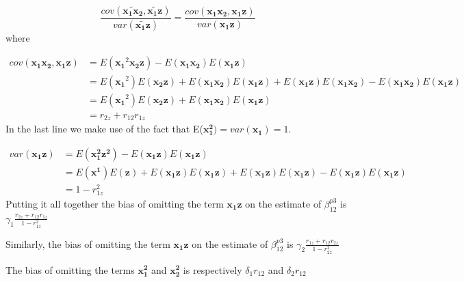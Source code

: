 \documentclass[12pt]{article}
\begin{document}
\begin{equation*}
\frac{cov(\widetilde{\mathbf{x_1 x_2}}, \widetilde{\mathbf{x_1 z}})}{var(\widetilde{\mathbf{x_1 z}})} =
\frac{cov(\mathbf{x_1 x_2}, \mathbf{x_1 z})}{var(\mathbf{x_1 z})} 
\end{equation*}
where 

\begin{align*}
cov(\mathbf{x_1 x_2}, \mathbf{x_1 z}) &= E(\mathbf{x_1}^2 \mathbf{x_2 z }) - E(\mathbf{x_1 x_2}) E(\mathbf{x_1 z}) \\
&= E(\mathbf{x_1}^2) E(\mathbf{x_2 z }) + E(\mathbf{x_1 x_2}) E(\mathbf{x_1 z}) + E(\mathbf{x_1 z}) E(\mathbf{x_1 x_2}) - E(\mathbf{x_1 x_2}) E(\mathbf{x_1 z}) \\
&= E(\mathbf{x_1}^2) E(\mathbf{x_2 z }) + E(\mathbf{x_1 x_2}) E(\mathbf{x_1 z}) \\
&= r_{2z} + r_{12} r_{1z}
\end{align*}
In the last line we make use of the fact that E($\mathbf{x_1^2}) = var(\mathbf{x_1}) = 1$.

\begin{align*}
	var(\mathbf{x_1 z}) &= E(\mathbf{x_1^2 z^2}) - E(\mathbf{x_1 z}) E(\mathbf{x_1 z}) \\
	&= E(\mathbf{x^1}) E(\mathbf{z}) +  E(\mathbf{x_1 z}) E(\mathbf{x_1 z}) + E(\mathbf{x_1 z}) E(\mathbf{x_1 z}) - E(\mathbf{x_1 z}) E(\mathbf{x_1 z}) \\
	&= 1 - r^2_{1z}
\end{align*}
Putting it all together the bias of omitting the term $\mathbf{x_1 z}$ on the estimate of $\beta^{p3}_{12}$ is  $\gamma_1 \frac{r_{2z} + r_{12} r_{1z}}{1 - r^2_{1z}}$

Similarly, the bias of omitting the term $\mathbf{x_1 z}$ on the estimate of $\beta^{p3}_{12}$ is  $\gamma_2 \frac{r_{1z} + r_{12} r_{2z}}{1 - r_{2z}^2}$

The bias of omitting the terms $\mathbf{x_1^2}$ and $\mathbf{x_2^2}$ is respectively $\delta_1 r_{12}$ and $\delta_2 r_{12}$
\end{document}
